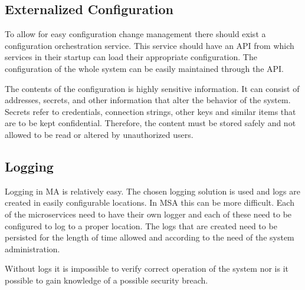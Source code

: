 \subsection{Externalized Configuration}
\begin{sloppypar}
    To allow for easy configuration change management there should exist a
    configuration orchestration service. This service should have an API from
    which services in their startup can load their appropriate configuration.
    The configuration of the whole system can be easily maintained through the
    API.
\end{sloppypar}
\begin{sloppypar}
    The contents of the configuration is highly sensitive information. It can
    consist of addresses, secrets, and other information that alter the behavior
    of the system. Secrets refer to credentials, connection strings, other keys
    and similar items that are to be kept confidential. Therefore, the content
    must be stored safely and not allowed to be read or altered by unauthorized
    users.
\end{sloppypar}

\subsection{Logging}
\begin{sloppypar}
    Logging in MA is relatively easy. The chosen logging solution is used and
    logs are created in easily configurable locations. In MSA this can be more
    difficult. Each of the microservices need to have their own logger and each
    of these need to be configured to log to a proper location. The logs that
    are created need to be persisted for the length of time allowed and
    according to the need of the system administration.
\end{sloppypar}
\begin{sloppypar}
    Without logs it is impossible to verify correct operation of the system nor
    is it possible to gain knowledge of a possible security breach. 
\end{sloppypar}
\begin{sloppypar}
\end{sloppypar}
\begin{sloppypar}
\end{sloppypar}
\begin{sloppypar}
\end{sloppypar}
\begin{sloppypar}

\end{sloppypar}

